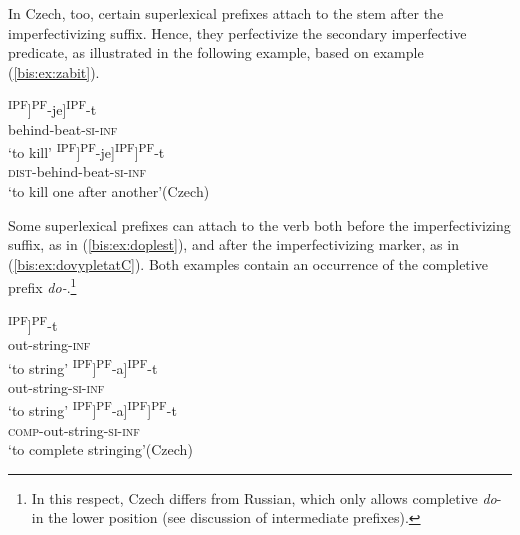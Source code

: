 \documentclass[output=paper]{langscibook}
\begin{document}
\noindent In Czech, too, certain superlexical prefixes attach to the stem after the imperfectivizing suffix. Hence, they perfectivize the secondary imperfective predicate, as illustrated in the following example, based on example (\ref{bis:ex:zabit}).

\ea\label{bis:ex:zabijet}
\ea\label{bis:ex:zabijetA} \gll [[za-[bí]\textsuperscript{IPF}]\textsuperscript{PF}-je]\textsuperscript{IPF}-t \\  
behind-beat-\textsc{si}-\textsc{inf} \\
\glt ‘to kill’
\ex\label{bis:ex:pozabijetB} \gll [po-[[za-[bí]\textsuperscript{IPF}]\textsuperscript{PF}-je]\textsuperscript{IPF}]\textsuperscript{PF}-t \\  
\textsc{dist}-behind-beat-\textsc{si}-\textsc{inf} \\
\glt ‘to kill one after another’\hfill (Czech)
\z\z

\noindent Some superlexical prefixes can attach to the verb both before the imperfectivizing suffix, as in (\ref{bis:ex:doplest}), and after the imperfectivizing marker, as in (\ref{bis:ex:dovypletatC}). Both examples contain an occurrence of the completive prefix \textit{do-}.\footnote{In this respect, Czech differs from Russian, which only allows completive \textit{do}- in the lower position (see   discussion of intermediate prefixes).}

\ea\label{bis:ex:vyplest}
\ea\label{bis:ex:vyplestA} \gll [vy-[plés]\textsuperscript{IPF}]\textsuperscript{PF}-t \\ 
out-string-\textsc{inf} \\
\glt ‘to string’
\ex\label{bis:ex:vypletatB} \gll [[vy-[plét]\textsuperscript{IPF}]\textsuperscript{PF}-a]\textsuperscript{IPF}-t \\  
out-string-\textsc{si}-\textsc{inf} \\
\glt ‘to string’
\ex\label{bis:ex:dovypletatC} \gll [do-[[vy-[plét]\textsuperscript{IPF}]\textsuperscript{PF}-a]\textsuperscript{IPF}]\textsuperscript{PF}-t \\  
\textsc{comp}-out-string-\textsc{si}-\textsc{inf} \\
\glt ‘to complete stringing’\hfill (Czech)
\z\z
\end{document}
